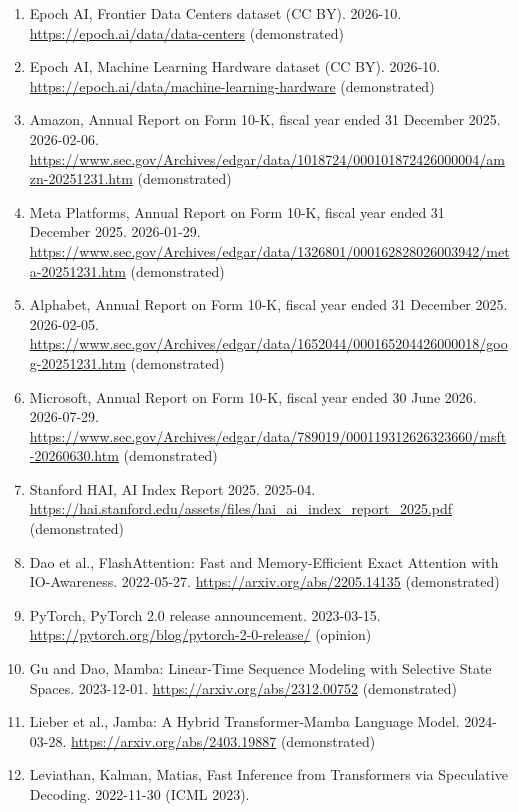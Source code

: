 \documentclass[10pt,letterpaper]{article}
\begin{document}
\begin{enumerate}
  U.S. Securities and Exchange Commission, XBRL company concept API
  (annual capital expenditure and operating cash flow, seven filers).
  2026-10. \url{https://data.sec.gov/api/xbrl/companyconcept/}
  (demonstrated)
\item
  Epoch AI, Frontier Data Centers dataset (CC BY). 2026-10.
  \url{https://epoch.ai/data/data-centers} (demonstrated)
\item
  Epoch AI, Machine Learning Hardware dataset (CC BY). 2026-10.
  \url{https://epoch.ai/data/machine-learning-hardware} (demonstrated)
\item
  Amazon, Annual Report on Form 10-K, fiscal year ended 31 December
  2025. 2026-02-06.
  \url{https://www.sec.gov/Archives/edgar/data/1018724/000101872426000004/amzn-20251231.htm}
  (demonstrated)
\item
  Meta Platforms, Annual Report on Form 10-K, fiscal year ended 31
  December 2025. 2026-01-29.
  \url{https://www.sec.gov/Archives/edgar/data/1326801/000162828026003942/meta-20251231.htm}
  (demonstrated)
\item
  Alphabet, Annual Report on Form 10-K, fiscal year ended 31 December
  2025. 2026-02-05.
  \url{https://www.sec.gov/Archives/edgar/data/1652044/000165204426000018/goog-20251231.htm}
  (demonstrated)
\item
  Microsoft, Annual Report on Form 10-K, fiscal year ended 30 June 2026.
  2026-07-29.
  \url{https://www.sec.gov/Archives/edgar/data/789019/000119312626323660/msft-20260630.htm}
  (demonstrated)
\item
  Stanford HAI, AI Index Report 2025. 2025-04.
  \url{https://hai.stanford.edu/assets/files/hai_ai_index_report_2025.pdf}
  (demonstrated)
\item
  Dao et al., FlashAttention: Fast and Memory-Efficient Exact Attention
  with IO-Awareness. 2022-05-27. \url{https://arxiv.org/abs/2205.14135}
  (demonstrated)
\item
  PyTorch, PyTorch 2.0 release announcement. 2023-03-15.
  \url{https://pytorch.org/blog/pytorch-2-0-release/} (opinion)
\item
  Gu and Dao, Mamba: Linear-Time Sequence Modeling with Selective State
  Spaces. 2023-12-01. \url{https://arxiv.org/abs/2312.00752}
  (demonstrated)
\item
  Lieber et al., Jamba: A Hybrid Transformer-Mamba Language Model.
  2024-03-28. \url{https://arxiv.org/abs/2403.19887} (demonstrated)
\item
  Leviathan, Kalman, Matias, Fast Inference from Transformers via
  Speculative Decoding. 2022-11-30 (ICML 2023).

\end{enumerate}
\end{document}
